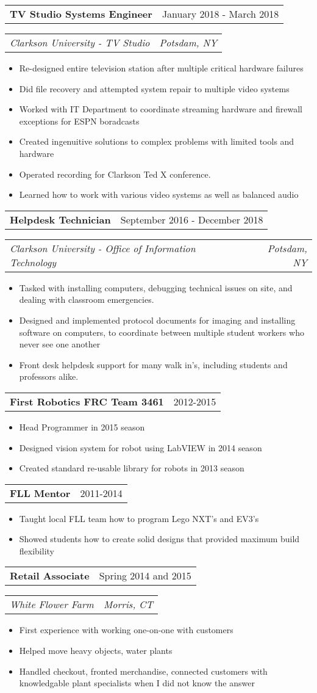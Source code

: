 \documentclass[letterpaper,12pt]{article}
\makeatletter
\newcommand{\resitem}[1]{\item #1 \vspace{-3pt}}
\newcommand{\topheading}[2]{
\begin{tabular*}{6.5in}{l@{\extracolsep{\fill}}r}
		\textbf{#1} & #2 \\
\end{tabular*}}
\newcommand{\bottomheading}[2]{
\begin{tabular*}{6.5in}{l@{\extracolsep{\fill}}r}
		\textit{#1} & \textit{#2} \\
\end{tabular*}\vspace{-6pt}}
\newcommand{\singleheading}[2]{
\vspace{6pt}
\begin{tabular*}{6.5in}{l@{\extracolsep{\fill}}r}
		\textbf{#1} & #2 \\
\end{tabular*}
\vspace{-3pt}
}
\makeatother
\begin{document}
\begin{itemize}
	\topheading{TV Studio Systems Engineer}{January 2018 - March 2018}
	\bottomheading{Clarkson University - TV Studio}{Potsdam, NY}
	\begin{itemize}
		\resitem{Re-designed entire television station after multiple critical hardware failures}
		\resitem{Did file recovery and attempted system repair to multiple video systems}
		\resitem{Worked with IT Department to coordinate streaming hardware and firewall exceptions for ESPN boradcasts}
		\resitem{Created ingenuitive solutions to complex problems with limited tools and hardware}
		\resitem{Operated recording for Clarkson Ted X conference.}
		\resitem{Learned how to work with various video systems as well as balanced audio}
	\end{itemize}

	\topheading{Helpdesk Technician}{September 2016 - December 2018}
	\bottomheading{Clarkson University - Office of Information Technology}{Potsdam, NY}
	\begin{itemize}
		\resitem{Tasked with installing computers, debugging technical issues on site, and dealing with classroom emergencies.}
		\resitem{Designed and implemented protocol documents for imaging and installing software on computers, to coordinate between multiple student workers who never see one another}
		\resitem{Front desk helpdesk support for many walk in's, including students and professors alike.}
	\end{itemize}

	\newpage

	\singleheading{First Robotics FRC Team 3461}{2012-2015}
	\begin{itemize}
		\resitem{Head Programmer in 2015 season}
		\resitem{Designed vision system for robot using LabVIEW in 2014 season}
		\resitem{Created standard re-usable library for robots in 2013 season}
	\end{itemize}

	\singleheading{FLL Mentor}{2011-2014}
	\begin{itemize}
		\resitem{Taught local FLL team how to program Lego NXT's and EV3's}
		\resitem{Showed students how to create solid designs that provided maximum build flexibility}
	\end{itemize}

	\topheading{Retail Associate}{Spring 2014 and 2015}
	\bottomheading{White Flower Farm}{Morris, CT}
	\begin{itemize}
		\resitem{First experience with working one-on-one with customers}
		\resitem{Helped move heavy objects, water plants}
		\resitem{Handled checkout, fronted merchandise, connected customers with knowledgable plant specialists when I did not know the answer}
	\end{itemize}


\end{itemize}
\end{document}
